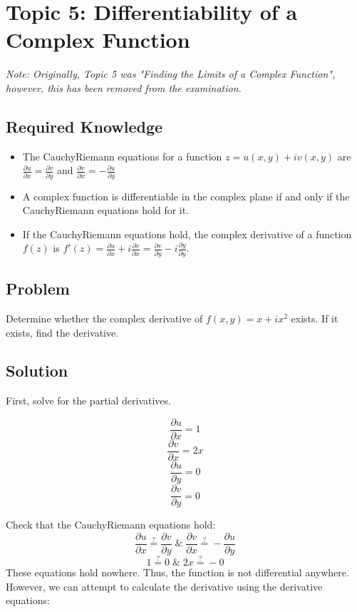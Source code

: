 \documentclass[12pt]{article}
\newcommand{\mightequal}{\stackrel{?}{=}}
\begin{document}
\section{Topic 5: Differentiability of a Complex Function}
\textit{Note: Originally, Topic 5 was "Finding the Limits of a Complex Function", however, this has been removed from the examination.}

\subsection{Required Knowledge}
\begin{itemize}
    \item The Cauchy\-Riemann equations for a function $z=u(x,y)+iv(x,y)$ are $\frac{\partial u}{\partial x}=\frac{\partial v}{\partial y}$ and $\frac{\partial v}{\partial x}=-\frac{\partial u}{\partial y}$
    \item A complex function is differentiable in the complex plane if and only if the Cauchy\-Riemann equations hold for it.
    \item If the Cauchy\-Riemann equations hold, the complex derivative of a function $f(z)$ is $f\prime(z)=\frac{\partial u}{\partial x}+i\frac{\partial v}{\partial x}=\frac{\partial v}{\partial y}-i\frac{\partial y}{\partial y}$.
\end{itemize}
\subsection{Problem}
Determine whether the complex derivative of $f(x,y)=x+ix^2$ exists.  If it exists, find the derivative.
\subsection{Solution}
First, solve for the partial derivatives.

\begin{equation}
	\frac{\partial u}{\partial x}=1
\end{equation}
\begin{equation}
	\frac{\partial v}{\partial x}=2x
\end{equation}
\begin{equation}
	\frac{\partial u}{\partial y}=0
\end{equation}
\begin{equation}
	\frac{\partial v}{\partial y}=0
\end{equation}

Check that the Cauchy\-Riemann equations hold:
\begin{equation}
    \frac{\partial u}{\partial x}\mightequal\frac{\partial v}{\partial y}\;\&\;\frac{\partial v}{\partial x}\mightequal-\frac{\partial u}{\partial y}
\end{equation}
\begin{equation}
    1\mightequal0\;\&\;2x\mightequal-0
\end{equation}
These equations hold nowhere.  Thus, the function is not differential anywhere.  However, we can attempt to calculate the derivative using the derivative equations:
\end{document}
